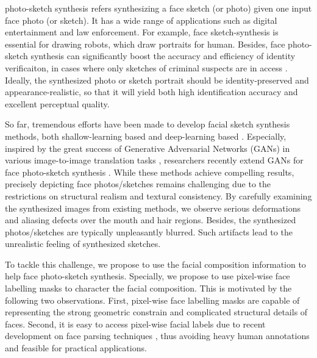 \documentclass[journal]{IEEEtran}
\begin{document}
 photo-sketch synthesis refers synthesizing a face sketch (or photo) given one input face photo (or sketch). It has a wide range of applications such as digital entertainment and law enforcement. 
For example, face sketch-synthesis is essential for drawing robots, which draw portraits for human. Besides, face photo-sketch synthesis can significantly boost the accuracy and efficiency of identity verificaiton, in cases where only sketches of criminal suspects are in access \cite{Wang2014A}. 
Ideally, the synthesized photo or sketch portrait should be identity-preserved and appearance-realistic, so that it will yield both high identification accuracy and excellent perceptual quality. 

So far, tremendous efforts have been made to develop facial sketch synthesis methods, both shallow-learning based and deep-learning based \cite{Wang2017RSLCR,Zhang2018Markov,Zhang2019NPGM}.
Especially, inspired by the great success of Generative Adversarial Networks (GANs) \cite{Goodfellow2014GAN} in various image-to-image translation tasks \cite{Isola2017Pix2Pix,Xian2017SurveyGAN}, researchers recently extend GANs for face photo-sketch synthesis \cite{wang2017bpgan,Di2017VAEGAN,Zhang2018IJCAI}. While these methods achieve compelling results, precisely depicting face photos/sketches remains challenging due to the restrictions on structural realism and textural consistency. By carefully examining the synthesized images from existing methods, we observe serious deformations and aliasing defects over the mouth and hair regions. Besides, the synthesized photos/sketches are typically unpleasantly blurred. Such artifacts lead to the unrealistic feeling of synthesized sketches. 

To tackle this challenge, we propose to use the facial composition information to help face photo-sketch synthesis. Specially, we propose to use pixel-wise face labelling masks to character the facial composition. This is motivated by the following two observations. First, pixel-wise face labelling masks are capable of representing the strong geometric constrain and complicated structural details of faces. Second, it is easy to access pixel-wise facial labels due to recent development on face parsing techniques \cite{Liu2015Multi}, thus avoiding heavy human annotations and feasible for practical applications.
\end{document}
